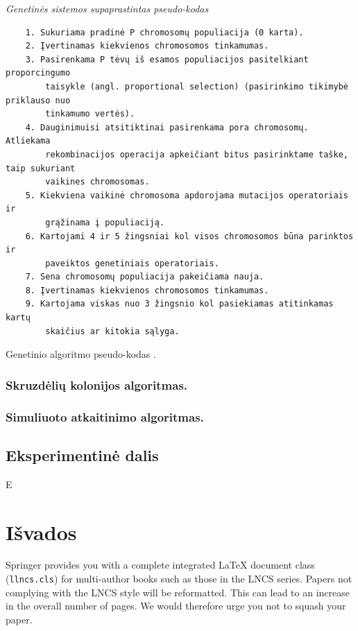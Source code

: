 \documentclass[runningheads,a4paper]{llncs}
\begin{document}
\medskip

\noindent
{\it Genetinės sistemos supaprastintas pseudo-kodas}
\begin{verbatim}
    1. Sukuriama pradinė P chromosomų populiacija (0 karta).
    2. Įvertinamas kiekvienos chromosomos tinkamumas.
    3. Pasirenkama P tėvų iš esamos populiacijos pasitelkiant proporcingumo 
        taisykle (angl. proportional selection) (pasirinkimo tikimybė priklauso nuo 
        tinkamumo vertės).
    4. Dauginimuisi atsitiktinai pasirenkama pora chromosomų. Atliekama 
        rekombinacijos operacija apkeičiant bitus pasirinktame taške, taip sukuriant 
        vaikines chromosomas.
    5. Kiekviena vaikinė chromosoma apdorojama mutacijos operatoriais ir 
        grąžinama į populiaciją.
    6. Kartojami 4 ir 5 žingsniai kol visos chromosomos būna parinktos ir 
        paveiktos genetiniais operatoriais.
    7. Sena chromosomų populiacija pakeičiama nauja.
    8. Įvertinamas kiekvienos chromosomos tinkamumas.
    9. Kartojama viskas nuo 3 žingsnio kol pasiekiamas atitinkamas kartų 
        skaičius ar kitokia sąlyga.
\end{verbatim}
%
\noindent
{\small Genetinio algoritmo pseudo-kodas \cite{genetictsp}.}


\subsubsection{Skruzdėlių kolonijos algoritmas.}

\subsubsection{Simuliuoto atkaitinimo algoritmas.}


\subsection{Eksperimentinė dalis}

E

\section{Išvados}

Springer provides you with a complete integrated \LaTeX{} document class
(\texttt{llncs.cls}) for multi-author books such as those in the LNCS
series. Papers not complying with the LNCS style will be reformatted.
This can lead to an increase in the overall number of pages. We would
therefore urge you not to squash your paper.
\end{document}
